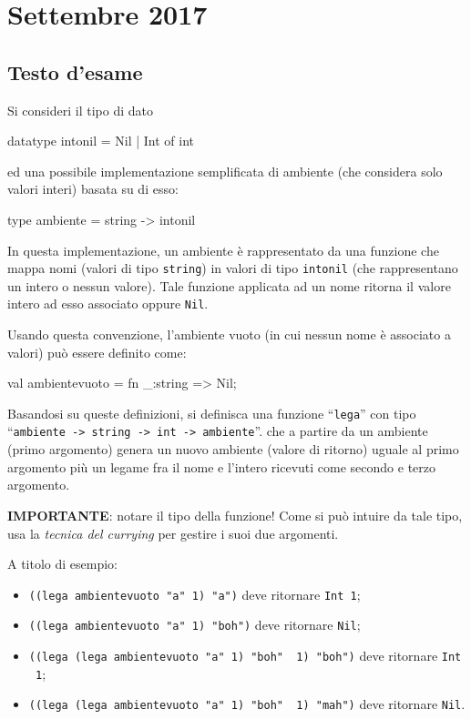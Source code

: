 \section{Settembre 2017}

\subsection{Testo d'esame}

Si consideri il tipo di dato

\begin{smlcode}
datatype intonil = Nil | Int of int
\end{smlcode}

ed una possibile implementazione semplificata di ambiente (che considera solo valori interi) basata su di esso:

\begin{smlcode}
type ambiente = string -> intonil
\end{smlcode}

In questa implementazione, un ambiente è rappresentato da una funzione che mappa nomi (valori di tipo \texttt{string}) in valori di tipo \texttt{intonil} (che rappresentano un intero o nessun valore). Tale funzione applicata ad un nome ritorna il valore intero ad esso associato oppure \texttt{Nil}.

\medskip
Usando questa convenzione, l'ambiente vuoto (in cui nessun nome è associato a valori) può essere definito come:

\begin{smlcode}
val ambientevuoto = fn _:string => Nil;
\end{smlcode}

Basandosi su queste definizioni, si definisca una funzione ``\texttt{lega}'' con tipo ``\texttt{ambiente -> string -> int -> ambiente}''. che a partire da un ambiente (primo argomento) genera un nuovo ambiente (valore di ritorno) uguale al primo argomento più un legame fra il nome e l'intero ricevuti come secondo e terzo argomento.

\medskip
\textbf{IMPORTANTE}: notare il tipo della funzione! Come si può intuire da tale tipo, usa la \emph{tecnica del currying} per gestire i suoi due argomenti.

\medskip
A titolo di esempio:
\begin{itemize}
	\item \texttt{((lega ambientevuoto "a" 1) "a")} deve ritornare \texttt{Int 1};
	\item \texttt{((lega ambientevuoto "a" 1) "boh")} deve ritornare \texttt{Nil};
	\item \texttt{((lega (lega ambientevuoto "a" 1) "boh" ~1) "boh")} deve ritornare \texttt{Int ~1};
	\item \texttt{((lega (lega ambientevuoto "a" 1) "boh" ~1) "mah")} deve ritornare \texttt{Nil}.
\end{itemize}

